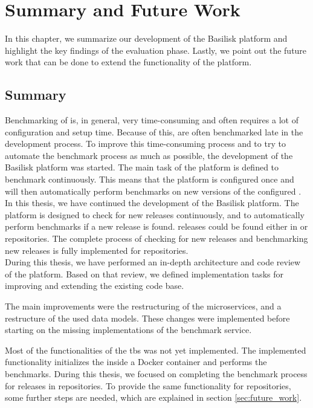 \chapter{Summary and Future Work}
\label{ch:summary}

In this chapter, we summarize our development of the Basilisk platform and highlight the key findings of the evaluation phase.
Lastly, we point out the future work that can be done to extend the functionality of the platform.

\section{Summary}
Benchmarking of \tsp{} is, in general, very time-consuming and often requires a lot of configuration and setup time.
Because of this, \tsp{} are often benchmarked late in the development process.
To improve this time-consuming process and to try to automate the benchmark process as much as possible, the development of the Basilisk platform was started.
The main task of the platform is defined to benchmark \tsp{} continuously.
This means that the platform is configured once and will then automatically perform benchmarks on new versions of the configured \tsp{}.
\\

In this thesis, we have continued the development of the Basilisk platform.
The platform is designed to check for new \ts{} releases continuously, and to automatically perform benchmarks if a new release is found.
\ts{} releases could be found either in \dockh{} or \gh{} repositories.
The complete process of checking for new releases and benchmarking new releases is fully implemented for \dockh{} repositories.
\\

During this thesis, we have performed an in-depth architecture and code review of the platform.
Based on that review, we defined implementation tasks for improving and extending the existing code base.

The main improvements were the restructuring of the microservices, and a restructure of the used data models.
These changes were implemented before starting on the missing implementations of the benchmark service.

Most of the functionalities of the \acl{tbs} was not yet implemented.
The implemented functionality initializes the \ts{} inside a Docker container and performs the benchmarks.
During this thesis, we focused on completing the benchmark process for \ts{} releases in \dockh{} repositories.
To provide the same functionality for \gh{} repositories, some further steps are needed, which are explained in section \ref{sec:future_work}.

